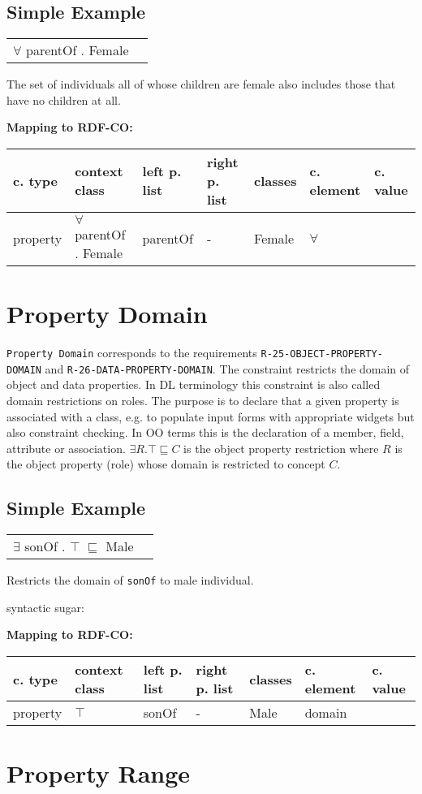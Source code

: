 \documentclass{llncs}
\newcommand{\ms}[1]{\texttt{#1}}
\newenvironment{gcotable}{
  \scriptsize
  \sffamily
  \vspace{0cm}
	\begin{center}
	\textbf{\vspace{0.4cm}Mapping to RDF-CO:} \\
  \begin{tabular}{l|l|l|l|l|l|l}
	\hline
  \textbf{c. type} & \textbf{context class} & \textbf{left p. list} & \textbf{right p. list} & \textbf{classes} & \textbf{c. element} & \textbf{c. value} \\
  \hline

}{
  \hline
  \end{tabular}
	\end{center}
}
\newenvironment{DL}{
  \vspace{0cm}
	\begin{center}
  \begin{tabular}{r l}

}{
  \end{tabular}
	\end{center}
}
\begin{document}
\subsection{Simple Example}

\begin{DL}
$\forall$ parentOf . Female
\end{DL}

The set of individuals all of whose children are female also includes those that have no children at all.

\begin{gcotable}
property & $\forall$ parentOf . Female & parentOf & - & Female & $\forall$ \\
\end{gcotable}

\section{Property Domain}

\ms{Property Domain} corresponds to the requirements \ms{R-25-OBJECT-PROPERTY-DOMAIN} and \ms{R-26-DATA-PROPERTY-DOMAIN}.
The constraint restricts the domain of object and data properties.
In DL terminology this constraint is also called domain restrictions on roles.
The purpose is to declare that a given property is associated with a class, e.g. to populate input forms with appropriate widgets but also constraint checking. In OO terms this is the declaration of a member, field, attribute or association. 
$\exists R. \top \sqsubseteq C$ is the object property restriction where $R$ is the object property (role) whose domain is restricted to concept $C$.

\subsection{Simple Example}

\begin{DL}
$\exists$ sonOf . $\top$ $\sqsubseteq$ Male 
\end{DL}

Restricts the domain of \ms{sonOf} to male individual.

syntactic sugar:

\begin{gcotable}
property & $\top$ & sonOf & - & Male & domain \\
\end{gcotable}

\section{Property Range}
\end{document}
